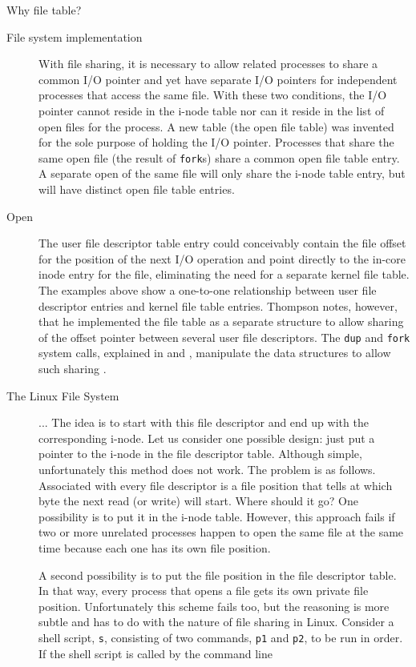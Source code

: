 Why file table?
\begin{description}
\item[File system implementation] With ﬁle sharing, it is necessary to allow related
  processes to share a common I/O pointer and yet have separate I/O pointers for
  independent processes that access the same ﬁle.  With these two conditions, the I/O
  pointer cannot reside in the i-node table nor can it reside in the list of open ﬁles for
  the process.  A new table (the open ﬁle table) was invented for the sole purpose of
  holding the I/O pointer. Processes that share the same open ﬁle (the result of
  \texttt{fork}s) share a common open ﬁle table entry.  A separate open of the same ﬁle
  will only share the i-node table entry, but will have distinct open ﬁle table
  entries.
\item[Open] The user file descriptor table entry could conceivably contain the file offset
  for the position of the next I/O operation and point directly to the in-core inode entry
  for the file, eliminating the need for a separate kernel file table. The examples above
  show a one-to-one relationship between user file descriptor entries and kernel file
  table entries. Thompson notes, however, that he implemented the file table as a separate
  structure to allow sharing of the offset pointer between several user file
  descriptors. The
  \texttt{dup} and \texttt{fork} system calls, explained in
   and ,
  manipulate the data structures to allow such sharing
  .
\item[The Linux File System] ... The idea is to start with this file descriptor and end up
  with the corresponding i-node. Let us consider one possible design: just put a pointer
  to the i-node in the file descriptor table. Although simple, unfortunately this method
  does not work.  The problem is as follows. Associated with every file descriptor is a
  file position that tells at which byte the next read (or write) will start. Where should
  it go?  One possibility is to put it in the i-node table. However, this approach fails
  if two or more unrelated processes happen to open the same file at the same time because
  each one has its own file position.

  A second possibility is to put the file position in the file descriptor table. In that
  way, every process that opens a file gets its own private file position. Unfortunately
  this scheme fails too, but the reasoning is more subtle and has to do with the nature of
  file sharing in Linux. Consider a shell script, \texttt{s}, consisting of two commands,
  \texttt{p1} and \texttt{p2}, to be run in order. If the shell script is called by the
  command line


\end{description}
